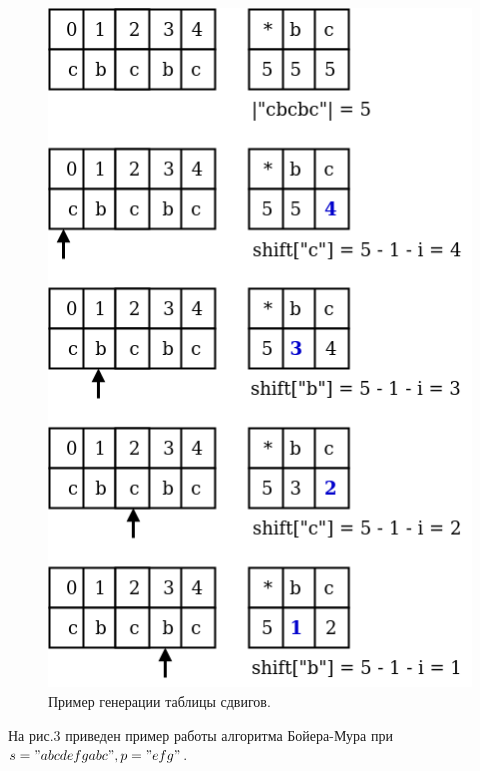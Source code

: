 \documentclass[a4paper,12pt]{article}
\begin{document}
\begin{figure}[H]	
			 	{
			 		\centering
			 		\includegraphics[scale=0.53]{2.png}
			 		\caption{Пример генерации таблицы сдвигов.}
			 		\label{pic:ant_schema}
			 	}
			 \end{figure}
			 
			 \newpage
На рис.3 приведен пример работы алгоритма Бойера-Мура при $s = "abcdefgabc", p = "efg"$.
\end{document}
